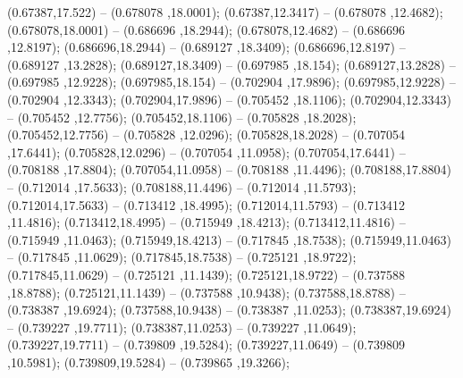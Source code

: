  (0.67387,17.522) -- (0.678078 ,18.0001);
 (0.67387,12.3417) -- (0.678078 ,12.4682);
 (0.678078,18.0001) -- (0.686696 ,18.2944);
 (0.678078,12.4682) -- (0.686696 ,12.8197);
 (0.686696,18.2944) -- (0.689127 ,18.3409);
 (0.686696,12.8197) -- (0.689127 ,13.2828);
 (0.689127,18.3409) -- (0.697985 ,18.154);
 (0.689127,13.2828) -- (0.697985 ,12.9228);
 (0.697985,18.154) -- (0.702904 ,17.9896);
 (0.697985,12.9228) -- (0.702904 ,12.3343);
 (0.702904,17.9896) -- (0.705452 ,18.1106);
 (0.702904,12.3343) -- (0.705452 ,12.7756);
 (0.705452,18.1106) -- (0.705828 ,18.2028);
 (0.705452,12.7756) -- (0.705828 ,12.0296);
 (0.705828,18.2028) -- (0.707054 ,17.6441);
 (0.705828,12.0296) -- (0.707054 ,11.0958);
 (0.707054,17.6441) -- (0.708188 ,17.8804);
 (0.707054,11.0958) -- (0.708188 ,11.4496);
 (0.708188,17.8804) -- (0.712014 ,17.5633);
 (0.708188,11.4496) -- (0.712014 ,11.5793);
 (0.712014,17.5633) -- (0.713412 ,18.4995);
 (0.712014,11.5793) -- (0.713412 ,11.4816);
 (0.713412,18.4995) -- (0.715949 ,18.4213);
 (0.713412,11.4816) -- (0.715949 ,11.0463);
 (0.715949,18.4213) -- (0.717845 ,18.7538);
 (0.715949,11.0463) -- (0.717845 ,11.0629);
 (0.717845,18.7538) -- (0.725121 ,18.9722);
 (0.717845,11.0629) -- (0.725121 ,11.1439);
 (0.725121,18.9722) -- (0.737588 ,18.8788);
 (0.725121,11.1439) -- (0.737588 ,10.9438);
 (0.737588,18.8788) -- (0.738387 ,19.6924);
 (0.737588,10.9438) -- (0.738387 ,11.0253);
 (0.738387,19.6924) -- (0.739227 ,19.7711);
 (0.738387,11.0253) -- (0.739227 ,11.0649);
 (0.739227,19.7711) -- (0.739809 ,19.5284);
 (0.739227,11.0649) -- (0.739809 ,10.5981);
 (0.739809,19.5284) -- (0.739865 ,19.3266);
